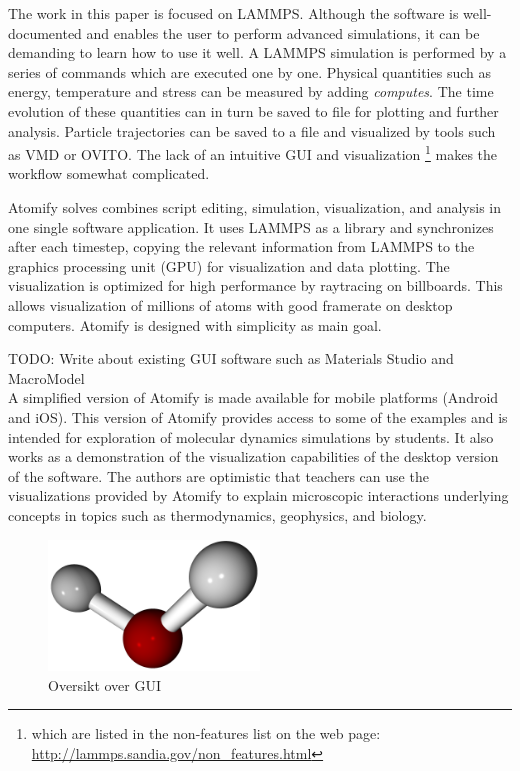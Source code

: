 \documentclass[aps,pre,twocolumn,letterpaper,floatfix]{revtex4-1}
\begin{document}
The work in this paper is focused on LAMMPS.
Although the software is well-documented and enables the user to perform
advanced simulations, it can be demanding to learn how to use it well.
A LAMMPS simulation is performed by a series of commands which are executed one by
one.
Physical quantities such as energy, temperature and stress can be measured by
adding \textit{computes}.
The time evolution of these quantities can in turn be saved to file for plotting
and further analysis.
Particle trajectories can be saved to a file and visualized by tools such as
VMD\cite{Humphrey1996Vmd} or OVITO\cite{Stukowski2009Visualization}.
The lack of an intuitive GUI and visualization \footnote{which are listed in the
non-features list on the web page:
\url{http://lammps.sandia.gov/non_features.html}} makes the workflow somewhat
complicated.

Atomify solves combines script editing, simulation,
visualization, and analysis in one single software application.
It uses LAMMPS as a library and synchronizes after each timestep,
copying the relevant information from LAMMPS to the graphics processing unit
(GPU) for visualization and data plotting.
The visualization is optimized for high performance by raytracing on billboards.
This allows visualization of millions of atoms with good framerate on desktop
computers. Atomify is designed with simplicity as main goal.

TODO: Write about existing GUI software such as Materials Studio and MacroModel \\

A simplified version of Atomify is made available for mobile platforms (Android
and iOS).
This version of Atomify provides access to some of the examples and is intended
for exploration of molecular dynamics simulations by students.
It also works as a demonstration of the visualization capabilities of the
desktop version of the software.
The authors are optimistic that teachers can use the visualizations provided by
Atomify to explain microscopic interactions underlying concepts in topics such
as thermodynamics, geophysics, and biology.

\begin{figure}
	\centering
	\includegraphics[width=0.5\textwidth]{final_billboard.png}
	\caption{Oversikt over GUI}
	\label{fig:gui}
\end{figure}
\end{document}
